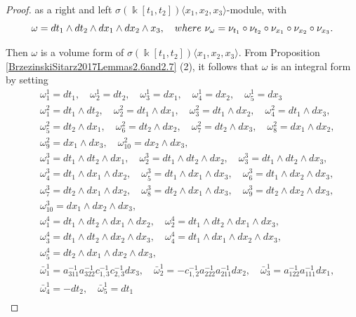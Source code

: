 \documentclass{amsart}
\theoremstyle{definition}
\theoremstyle{remark}
\numberwithin{equation}{section}
\begin{document}
\begin{proof}
as a right and left $\sigma(\Bbbk[t_1, t_2])\langle x_1, x_2, x_3\rangle$-module, with 
$$
\omega=dt_1\wedge dt_2 \wedge dx_1 \wedge dx_2 \wedge x_3, \quad {\rm where}\  \nu_{\omega}=\nu_{t_1}\circ\nu_{t_2}\circ\nu_{x_1}\circ\nu_{x_2}\circ\nu_{x_3}.
$$

Then $\omega$ is a volume form of $\sigma(\Bbbk[t_1, t_2])\langle x_1, x_2, x_3\rangle$. From Proposition \ref{BrzezinskiSitarz2017Lemmas2.6and2.7} (2), it follows that $\omega$ is an integral form by setting
\begin{align*}
    &\ \omega_1^1= dt_1, \quad \omega_2^1= dt_2, \quad \omega_3^1= dx_1, \quad \omega_4^1= dx_2, \quad \omega_5^1= dx_3 \\
    &\ \omega_1^2=dt_1\wedge dt_2, \quad \omega_2^2=dt_1\wedge dx_1, \quad \omega_3^2= dt_1\wedge dx_2, \quad  \omega_4^2= dt_1\wedge dx_3, \\
    &\ \omega_5^2= dt_2\wedge dx_1, \quad \omega_6^2= dt_2\wedge dx_2, \quad  \omega_7^2= dt_2\wedge dx_3, \quad  \omega_8^2= dx_1\wedge dx_2,  \\
    &\ \omega_9^2= dx_1\wedge dx_3, \quad \omega_{10}^2= dx_2\wedge dx_3,\\
    &\ \omega_1^3=dt_1\wedge dt_2\wedge dx_1, \quad \omega_2^3= dt_1\wedge dt_2 \wedge dx_2, \quad \omega_3^3= dt_1\wedge dt_2 \wedge dx_3, \\
    &\ \omega_4^3= dt_1\wedge dx_1 \wedge dx_2,  \quad \omega_5^3= dt_1\wedge dx_1 \wedge dx_3,  \quad \omega_6^3= dt_1\wedge dx_2 \wedge dx_3, \\
    &\ \omega_7^3= dt_2\wedge dx_1 \wedge dx_2,  \quad \omega_8^3= dt_2\wedge dx_1 \wedge dx_3,  \quad \omega_9^3= dt_2\wedge dx_2 \wedge dx_3, \\
     &\ \omega_{10}^3= dx_1\wedge dx_2 \wedge dx_3, \\
     &\ \omega_1^4=dt_1\wedge dt_2\wedge dx_1\wedge dx_2, \quad \omega_2^4= dt_1\wedge dt_2\wedge dx_1\wedge dx_3,\\
     &\ \omega_3^4= dt_1\wedge dt_2\wedge dx_2\wedge dx_3, \quad \omega_4^4= dt_1\wedge dx_1\wedge dx_2\wedge dx_3,  \\
     &\ \omega_5^4= dt_2\wedge dx_1\wedge dx_2\wedge dx_3,\\
     &\ \bar{\omega}_1^1=a_{311}^{-1}a_{322}^{-1}c_{1,3}^{-1}c_{2,3}^{-1}dx_3, \quad \bar{\omega}_2^1=-c_{1,2}^{-1}a_{222}^{-1}a_{211}^{-1}dx_2,\quad \bar{\omega}_3^1=a_{122}^{-1}a_{111}^{-1}dx_1, \\
     &\ \bar{\omega}_4^1=-dt_2, \quad \bar{\omega}_5^1=dt_1 \\

\end{align*}
\end{proof}
\end{document}
